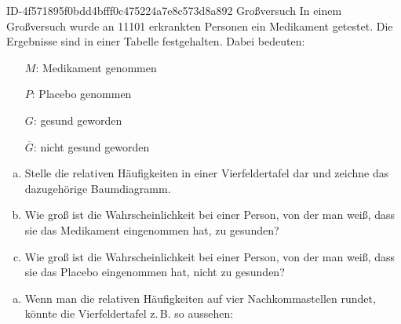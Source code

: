 \begin{exercise}
      {ID-4f571895f0bdd4bfff0c475224a7e8c573d8a892}
      {Großversuch}
  \ifproblem\problem
    In einem Großversuch wurde an \num{11101} erkrankten Personen ein
    Medikament getestet. Die Ergebnisse sind in einer Tabelle festgehalten.
    Dabei bedeuten:
    \begin{center}
      \begin{minipage}{0.45\linewidth}
        \begin{itemize}
          \setlength{\itemsep}{-0.1\baselineskip}
          \item[$M$:]            Medikament genommen
          \item[$P$:]            Placebo genommen
          \item[$G$:]            gesund geworden
          \item[$\overline{G}$:] nicht gesund geworden
        \end{itemize}%
      \end{minipage}%
      \begin{minipage}{0.45\linewidth}
        \centering
        \begin{fourfoldtable}
        \end{fourfoldtable}
      \end{minipage}%
    \end{center}%
    \begin{enumerate}[a)]
      \item Stelle die relativen Häufigkeiten in einer Vierfeldertafel dar
            und zeichne das dazugehörige Baumdiagramm.
      \item Wie groß ist die Wahrscheinlichkeit bei einer Person, von der
            man weiß, dass sie das Medikament eingenommen hat, zu gesunden?
      \item Wie groß ist die Wahrscheinlichkeit bei einer Person, von der
            man weiß, dass sie das Placebo eingenommen hat, nicht zu gesunden?
    \end{enumerate}
  \fi
  \ifoutcome\outcome
    \begin{enumerate}[a)]
      \item Wenn man die relativen Häufigkeiten auf vier Nachkommastellen
            rundet, könnte die Vierfeldertafel z.\,B. so aussehen:
            \begin{center}

\end{center}
\end{enumerate}
\end{exercise}
